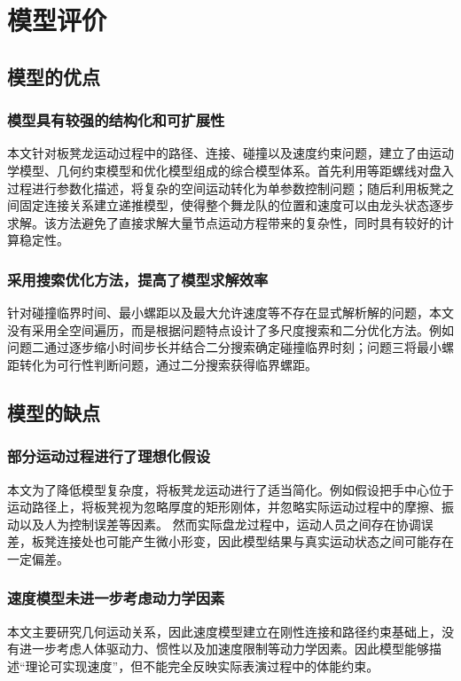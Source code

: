 \documentclass[UTF-8,a4paper,zihao=-4]{ctexart}
\begin{document}
\section{模型评价}
\subsection{模型的优点}
\subsubsection{模型具有较强的结构化和可扩展性}
本文针对板凳龙运动过程中的路径、连接、碰撞以及速度约束问题，建立了由运动学模型、几何约束模型和优化模型组成的综合模型体系。首先利用等距螺线对盘入过程进行参数化描述，将复杂的空间运动转化为单参数控制问题；随后利用板凳之间固定连接关系建立递推模型，使得整个舞龙队的位置和速度可以由龙头状态逐步求解。该方法避免了直接求解大量节点运动方程带来的复杂性，同时具有较好的计算稳定性。

\subsubsection{采用搜索优化方法，提高了模型求解效率}
针对碰撞临界时间、最小螺距以及最大允许速度等不存在显式解析解的问题，本文没有采用全空间遍历，而是根据问题特点设计了多尺度搜索和二分优化方法。例如问题二通过逐步缩小时间步长并结合二分搜索确定碰撞临界时刻；问题三将最小螺距转化为可行性判断问题，通过二分搜索获得临界螺距。

\subsection{模型的缺点}
\subsubsection{部分运动过程进行了理想化假设}
本文为了降低模型复杂度，将板凳龙运动进行了适当简化。例如假设把手中心位于运动路径上，将板凳视为忽略厚度的矩形刚体，并忽略实际运动过程中的摩擦、振动以及人为控制误差等因素。
然而实际盘龙过程中，运动人员之间存在协调误差，板凳连接处也可能产生微小形变，因此模型结果与真实运动状态之间可能存在一定偏差。

\subsubsection{速度模型未进一步考虑动力学因素}
本文主要研究几何运动关系，因此速度模型建立在刚性连接和路径约束基础上，没有进一步考虑人体驱动力、惯性以及加速度限制等动力学因素。因此模型能够描述“理论可实现速度”，但不能完全反映实际表演过程中的体能约束。
\end{document}
